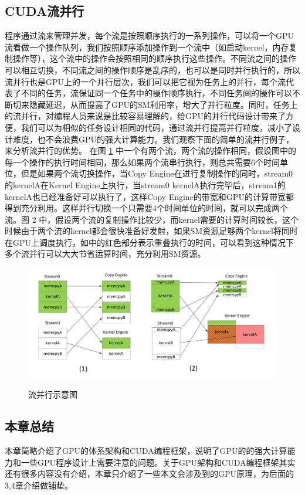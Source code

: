 \subsection{CUDA流并行}
程序通过流来管理并发，每个流是按照顺序执行的一系列操作，可以将一个GPU流看做一个操作队列，我们按照顺序添加操作到一个流中（如启动kernel，内存复制操作等），这个流中的操作会按照相同的顺序执行这些操作。不同流之间的操作可以相互切换，不同流之间的操作顺序是乱序的，也可以是同时并行执行的，所以流并行也是GPU上的一个并行层次，我们可以把它视为任务上的并行，每个流代表了不同的任务，流保证同一个任务中的操作顺序执行，不同任务间的操作可以不断切来隐藏延迟，从而提高了GPU的SM利用率，增大了并行粒度。同时，任务上的流并行，对编程人员来说是比较容易理解的，给GPU的并行代码设计带来了方便，我们可以为相似的任务设计相同的代码，通过流并行提高并行粒度，减小了设计难度，也不会浪费GPU的强大计算能力。我们观察下面的简单的流并行例子，来分析流并行的优势。
在图 \ref{flow} 中一个有两个流，两个流的操作相同，假设图中的每一个操作的执行时间相同，那么如果两个流串行执行，则总共需要6个时间单位，但是如果两个流切换操作，当Copy Engine在进行复制操作的同时，stream0的kernelA在Kernel Engine上执行，当stream0 kernelA执行完毕后，stream1的kernelA也已经准备好可以执行了，这样Copy Engine的带宽和GPU的计算带宽都得到充分利用。这样并行切换一个只需要4个时间单位的时间，就可以完成两个流。图 2 中，假设两个流的复制操作比较少，而kernel需要的计算时间较长，这个时候由于两个流的kernel都会很快准备好发射，如果SM资源足够两个kernel将同时在GPU上调度执行，如中的红色部分表示重叠执行的时间，可以看到这种情况下多个流并行可以大大节省运算时间，充分利用SM资源。
\begin{figure}
\setlength{\belowcaptionskip}{-0.5cm}
  \begin{center}
    {\includegraphics[width=1 \textwidth]{figures/flow.pdf}}
    \end{center}
  \caption{{\footnotesize{流并行示意图}}}
  \label{flow}
\end{figure}
\subsection{本章总结}
本章简略介绍了GPU的体系架构和CUDA编程框架，说明了GPU的的强大计算能力和一些GPU程序设计上需要注意的问题。关于GPU架构和CUDA编程框架其实还有很多内容没有介绍，本章只介绍了一些本文会涉及到的GPU原理，为后面的3,4章介绍做铺垫。